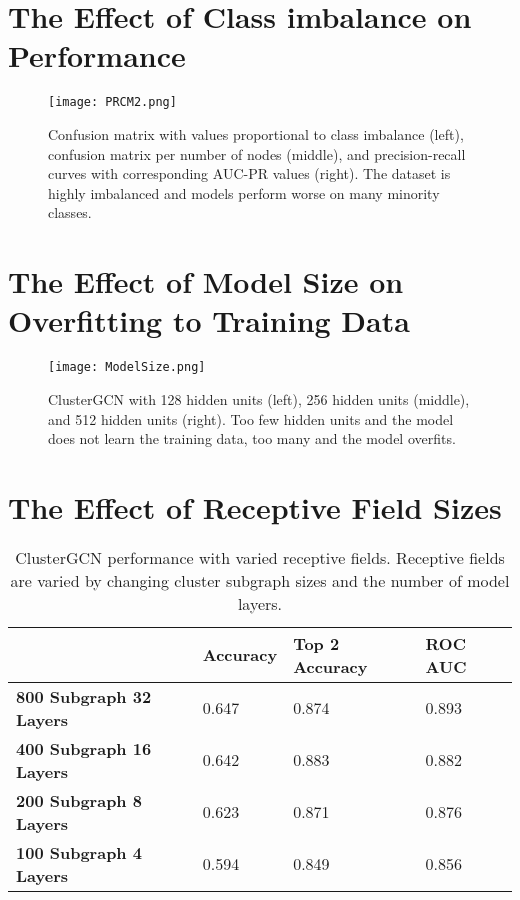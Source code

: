 \documentclass{article}
\begin{document}
\section{The Effect of Class imbalance on Performance}
\label{class-imabalance}

\begin{figure}[h]
  \centering
  \texttt{[image: PRCM2.png]}
  \caption{Confusion matrix with values proportional to class imbalance (left), confusion matrix per number of nodes (middle), and precision-recall curves with corresponding AUC-PR values (right). The dataset is highly imbalanced and models perform worse on many minority classes.}
\end{figure}

\pagebreak
\section{The Effect of Model Size on Overfitting to Training Data}
\label{overfitting}

\begin{figure}[h]
  \centering
  \texttt{[image: ModelSize.png]}
  \caption{ClusterGCN with 128 hidden units (left), 256 hidden units (middle), and 512 hidden units (right). Too few hidden units and the model does not learn the training data, too many and the model overfits.}
\end{figure}

\section{The Effect of Receptive Field Sizes}
\label{receptive-field}

\begin{table}[h]
  \caption{ClusterGCN performance with varied receptive fields. Receptive fields are varied by changing cluster subgraph sizes and the number of model layers.}
  \label{model-results-field}
  \centering
  \begin{tabular}{llll}
    \toprule
    & \textbf{Accuracy} & \textbf{Top 2 Accuracy} & \textbf{ROC AUC} \\
    \midrule
    \textbf{800 Subgraph 32 Layers} & 0.647 & 0.874 & 0.893 \\
    \textbf{400 Subgraph 16 Layers} & 0.642 & 0.883 & 0.882 \\
    \textbf{200 Subgraph 8 Layers} & 0.623 & 0.871 & 0.876 \\
    \textbf{100 Subgraph 4 Layers} & 0.594 & 0.849 & 0.856 \\
    \bottomrule
  \end{tabular}
\end{table}
\end{document}
